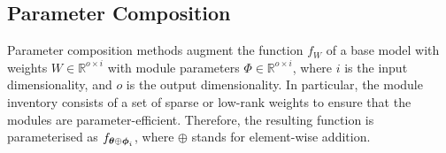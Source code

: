\documentclass[10pt]{article} %
\begin{document}
\subsection{Parameter Composition}
\label{sec:nature_modularity:parameter_composition}

Parameter composition methods augment the function $f_{W}$ of a base model with weights $W \in \mathbb{R}^{o \times i}$ with module parameters $\Phi \in \mathbb{R}^{o \times i}$, where $i$ is the input dimensionality, and $o$ is the output dimensionality. In particular, the module inventory consists of a set of sparse or low-rank weights to ensure that the modules are parameter-efficient. Therefore, the resulting function is parameterised as $f_{{{\bm{\theta}} \oplus {\bm{\phi}}}_i}$, where $\oplus$ stands for element-wise addition.

 
\end{document}
